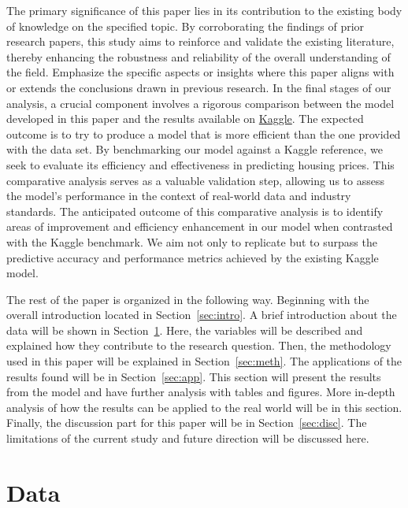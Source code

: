 \documentclass[12pt]{article}
\begin{document}
The primary significance of this paper lies in its contribution to the existing body of knowledge on the specified topic. By corroborating the findings of prior research papers, this study aims to reinforce and validate the existing literature, thereby enhancing the robustness and reliability of the overall understanding of the field. Emphasize the specific aspects or insights where this paper aligns with or extends the conclusions drawn in previous research. In the final stages of our analysis, a crucial component involves a rigorous comparison between the model developed in this paper and the results available on \href{https://www.kaggle.com/code/ashydv/housing-price-prediction-linear-regression/notebook}{Kaggle}. The expected outcome is to try to produce a model that is more efficient than the one provided with the data set. By benchmarking our model against a Kaggle reference, we seek to evaluate its efficiency and effectiveness in predicting housing prices. This comparative analysis serves as a valuable validation step, allowing us to assess the model's performance in the context of real-world data and industry standards. The anticipated outcome of this comparative analysis is to identify areas of improvement and efficiency enhancement in our model when contrasted with the Kaggle benchmark. We aim not only to replicate but to surpass the predictive accuracy and performance metrics achieved by the existing Kaggle model. 

The rest of the paper is organized in the following way. Beginning with the overall introduction located in Section~\ref{sec:intro}. A brief introduction about the data will be shown in Section~\ref{sec:data}. Here, the variables will be described and explained how they contribute to the research question. Then, the methodology used in this paper will be explained in Section~\ref{sec:meth}. The applications of the results found will be in Section~\ref{sec:app}. This section will present the results from the model and have further analysis with tables and figures. More in-depth analysis of how the results can be applied to the real world will be in this section. Finally, the discussion part for this paper will be in Section~\ref{sec:disc}. The limitations of the current study and future direction will be discussed here.



\section{Data}
\label{sec:data}
\end{document}

